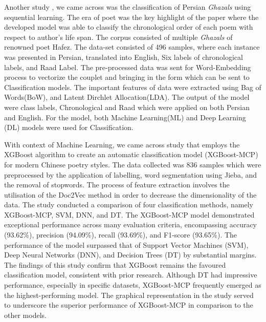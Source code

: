 \documentclass[conference]{IEEEtran}
\begin{document}
\par
Another study \cite{b1}, we came across was the classification of Persian \textit{Ghazals} using sequential learning. The era of poet was the key highlight of the paper where the developed model was able to classify the chronological order of each poem with respect to author's life span. The corpus consisted of multiple \textit{Ghazals} of renowned poet Hafez. The data-set consisted of 496 samples, where each instance was presented in Persian, translated into English, Six labels of chronological labels, and Raad Label. The pre-processed data was sent for Word-Embedding process to vectorize the couplet and bringing in the form which can be sent to Classification models. The important features of data were extracted using Bag of Words(BoW), and Latent Dirchlet Allocation(LDA). The output of the model were class labels, Chronological and Raad which were applied on both Persian and English. For the model, both Machine Learning(ML) and Deep Learning (DL) models were used for Classification. 


\par
With context of Machine Learning, we came across study \cite{b7} that employs the XGBoost algorithm to create an automatic classification model (XGBoost-MCP) for modern Chinese poetry styles. The data collected was 836 samples which were preprocessed by the application of labelling, word segmentation using Jieba, and the removal of stopwords. The process of feature extraction involves the utilisation of the Doc2Vec method in order to decrease the dimensionality of the data. The study conducted a comparison of four classification methods, namely XGBoost-MCP, SVM, DNN, and DT. The XGBoost-MCP model demonstrated exceptional performance across many evaluation criteria, encompassing accuracy (93.62\%), precision (94.09\%), recall (93.69\%), and F1-score (93.65\%). The performance of the model surpassed that of Support Vector Machines (SVM), Deep Neural Networks (DNN), and Decision Trees (DT) by substantial margins. The findings of this study confirm that XGBoost remains the favoured classification model, consistent with prior research. Although DT had impressive performance, especially in specific datasets, XGBoost-MCP frequently emerged as the highest-performing model. The graphical representation in the study served to underscore the superior performance of XGBoost-MCP in comparison to the other models.
\end{document}
